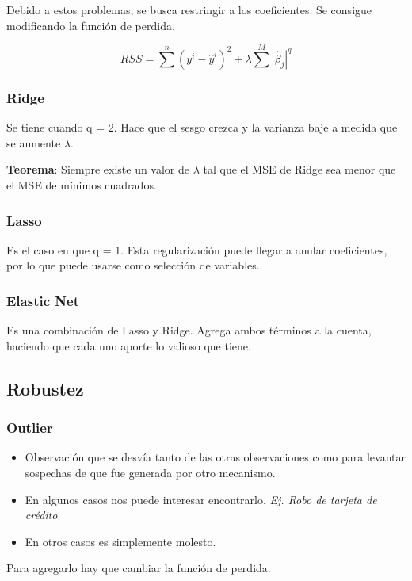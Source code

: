 \documentclass[titlepage,a4paper]{article}
\begin{document}
Debido a estos problemas, se busca restringir a los coeficientes. Se consigue modificando la función de perdida.

\begin{equation}
    RSS = \sum^{n} (y^{i}-\hat{y}^{i})^{2} + \lambda \sum^{M} |\hat{\beta}_j|^{q}
\end{equation}

\subsubsection{Ridge}
Se tiene cuando q = 2. Hace que el sesgo crezca y la varianza baje a medida que se aumente $\lambda$.

\textbf{Teorema}: Siempre existe un valor de $\lambda$ tal que el MSE de Ridge sea menor que el MSE de mínimos cuadrados.

\subsubsection{Lasso}
Es el caso en que q = 1. Esta regularización puede llegar a anular coeficientes, por lo que puede usarse como selección de variables.

\subsubsection{Elastic Net}
Es una combinación de Lasso y Ridge. Agrega ambos términos a la cuenta, haciendo que cada uno aporte lo valioso que tiene.

\subsection{Robustez}
\subsubsection*{Outlier}
\begin{itemize}
    \item Observación que se desvía tanto de las otras observaciones como para levantar sospechas de que fue generada por otro mecanismo.
    \item En algunos casos nos puede interesar encontrarlo. \textit{Ej. Robo de tarjeta de crédito}
    \item En otros casos es simplemente molesto.
\end{itemize}


Para agregarlo hay que cambiar la función de perdida.
\end{document}
